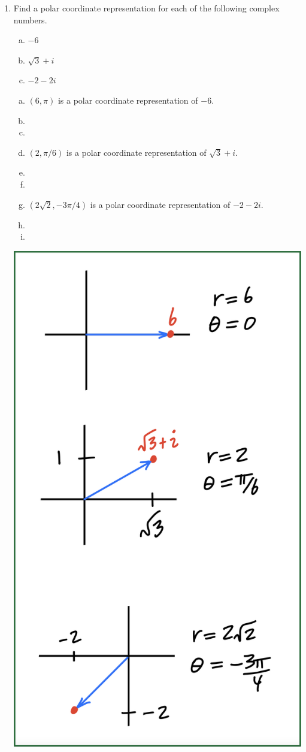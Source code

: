 \documentclass[11pt,fleqn,dvipsnames,usenames]{article}
\begin{document}
\begin{enumerate}
\item Find a polar coordinate representation for each of the following complex numbers.
\begin{multicols}{3}
\begin{enumerate}[(a)]
\item $-6$
\item $\sqrt{3} + i$
\item $-2-2i$
\end{enumerate}
\end{multicols}
\vsmsp
\begin{multicols}{2}
\solution
\begin{enumerate}[(a)]
\item $(6,\pi)$ is a polar coordinate representation of $-6$.
\item[\ ]
\item[\ ]
\item $(2,\pi/6)$ is a polar coordinate representation of $\sqrt{3} + i$.
\item[\ ]
\item[\ ]
\item $(2\sqrt{2},-3\pi/4)$ is a polar coordinate representation of $-2-2i$.
\item[\ ]
\item[\ ]
\end{enumerate}


\columnbreak

\hspace{1cm} \includegraphics[width=0.5\linewidth]{chapter2problem8.png}
\end{multicols}
\vsmsp


\end{enumerate}
\end{document}
